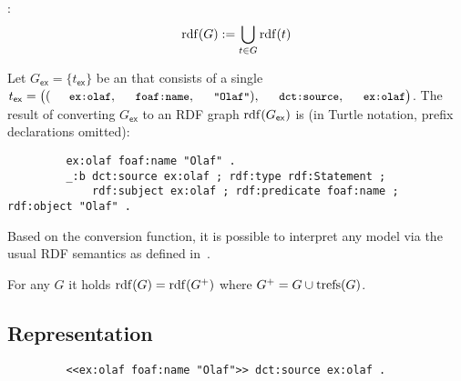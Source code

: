 \noindent
{}:
\begin{equation*}
	\mathrm{rdf}(G) := \bigcup_{t \in G} \mathrm{rdf}(t)
\end{equation*}

\begin{example}
	Let $G_\mathsf{ex} = \lbrace t_\mathsf{ex} \rbrace$ be an {\RDFplusGraph} that consists of a single {\RDFplusTriple} $t_\mathsf{ex} = \bigl( (\mathTinyRDF{ex:olaf},\mathTinyRDF{foaf:name},\mathTinyRDF{"Olaf"}), \mathTinyRDF{dct:source}, \mathTinyRDF{ex:olaf} \bigr)$.
	The result of converting $G_\mathsf{ex}$ to an RDF graph $\mathrm{rdf}(G_\mathsf{ex})$ is (in Turtle notation, prefix declarations omitted):
	\begin{footnotesize}%
	\begin{verbatim}
		 ex:olaf foaf:name "Olaf" .
		 _:b dct:source ex:olaf ; rdf:type rdf:Statement ;
		     rdf:subject ex:olaf ; rdf:predicate foaf:name ; rdf:object "Olaf" .
	\end{verbatim}%
	\end{footnotesize}
\end{example}

\noindent
Based on the conversion function, it is possible to interpret any {\RDFplus} model via the usual RDF semantics as defined in~\cite{Hayes04:RDFsemantics}.

\begin{proposition} \label{Proposition:JustificationForDataMinimality1}
	For any {\RDFplusGraph} $G$ it holds $\mathrm{rdf}(G) = \mathrm{rdf}(G^+)$ where $G^+ = G \cup \mathrm{trefs}(G)$.
\end{proposition}


\subsection{Representation}

	\begin{footnotesize}%
	\begin{verbatim}
		 <<ex:olaf foaf:name "Olaf">> dct:source ex:olaf .
	\end{verbatim}%
	\end{footnotesize}

